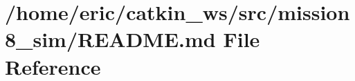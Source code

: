 \hypertarget{mission8__sim_2README_8md}{}\section{/home/eric/catkin\+\_\+ws/src/mission8\+\_\+sim/\+R\+E\+A\+D\+ME.md File Reference}
\label{mission8__sim_2README_8md}
